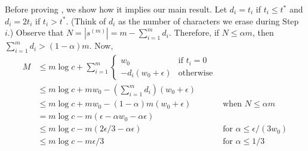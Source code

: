 \documentclass{patmorin}
\begin{document}
Before proving , we show how it implies our main result.  Let $d_i=t_i$ if $t_i\le t^*$ and $d_i=2t_i$ if $t_i>t^*$.  (Think of $d_i$ as the number of characters we erase during Step~$i$.)  Observe that $N=|s^{(m)}|=m-\sum_{i=1}^m d_i$.  Therefore, if $N\le \alpha m$, then $\sum_{i=1}^m d_i > (1-\alpha)m$.  Now,
\begin{align*}
  M & \le m\log c + \sum_{i=1}^m 
     \begin{cases}
         w_0 & \text{if $t_i=0$} \\
         -d_i(w_0+\epsilon) & \text{otherwise} 
       \end{cases} \\
     & \le m\log c + mw_0 - \left(\sum_{i=1}^m d_i\right)(w_0+\epsilon) \\ 
     & \le m\log c + mw_0 - (1-\alpha)m(w_0+\epsilon) 
     & \text{when $N\le\alpha m$} \\ 
     & = m\log c - m(\epsilon - \alpha w_0 - \alpha\epsilon) \\ 
     & \le m\log c - m(2\epsilon/3 - \alpha\epsilon) 
     & \text{for $\alpha \le \epsilon/(3w_0)$} \\ 
     & \le m\log c - m\epsilon/3 
     & \text{for $\alpha \le 1/3$} \\ 
\end{align*} 
\end{document}
